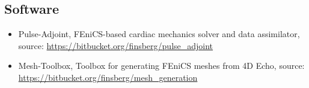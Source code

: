 \subsection{Software}
\begin{itemize}
  \item Pulse-Adjoint, FEniCS-based cardiac mechanics solver and data
    assimilator, source: \url{https://bitbucket.org/finsberg/pulse_adjoint}
  \item Mesh-Toolbox, Toolbox for generating FEniCS meshes from 4D
    Echo,  source: \url{https://bitbucket.org/finsberg/mesh_generation}
\end{itemize}


\newpage



